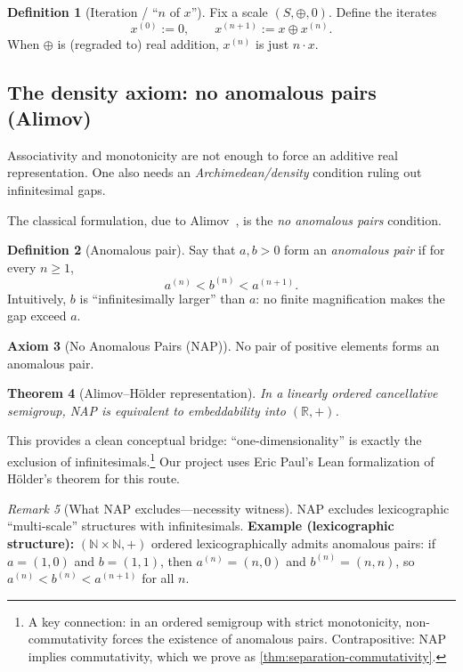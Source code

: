 \documentclass[11pt]{article}
\newtheorem{theorem}{Theorem}[section]
\theoremstyle{definition}
\newtheorem{definition}[theorem]{Definition}
\newtheorem{axiom}[theorem]{Axiom}
\theoremstyle{remark}
\newtheorem{remark}[theorem]{Remark}
\begin{document}
\begin{definition}[Iteration / ``$n$ of $x$'']
Fix a scale $(S,\oplus,0)$.  Define the iterates
\[
x^{(0)} := 0,\qquad x^{(n+1)} := x \oplus x^{(n)}.
\]
When $\oplus$ is (regraded to) real addition, $x^{(n)}$ is just $n\cdot x$.
\end{definition}

\subsection{The density axiom: no anomalous pairs (Alimov)}

Associativity and monotonicity are not enough to force an additive real representation.
One also needs an \emph{Archimedean/density} condition ruling out infinitesimal gaps.

The classical formulation, due to Alimov~\cite{Alimov1950},
is the \emph{no anomalous pairs} condition.

\begin{definition}[Anomalous pair]
Say that $a,b>0$ form an \emph{anomalous pair} if for every $n\ge 1$,
\[
a^{(n)} < b^{(n)} < a^{(n+1)}.
\]
Intuitively, $b$ is ``infinitesimally larger'' than $a$: no finite magnification makes the gap exceed $a$.
\end{definition}

\begin{axiom}[No Anomalous Pairs (NAP)]
No pair of positive elements forms an anomalous pair.
\end{axiom}

\begin{theorem}[Alimov--H\"older representation]
In a linearly ordered cancellative semigroup, NAP is equivalent to embeddability into $(\mathbb{R},+)$.
\end{theorem}

This provides a clean conceptual bridge: ``one-dimensionality'' is exactly the exclusion of
infinitesimals.\footnote{A key connection: in an ordered semigroup with strict monotonicity,
non-commutativity forces the existence of anomalous pairs.  Contrapositive: NAP implies
commutativity, which we prove as \cref{thm:separation-commutativity}.}
Our project uses Eric Paul's Lean formalization of H\"older's theorem for this route.

\begin{remark}[What NAP excludes---necessity witness]
NAP excludes lexicographic ``multi-scale'' structures with infinitesimals.
\textbf{Example (lexicographic structure):} $(\mathbb{N}\times\mathbb{N},+)$ ordered lexicographically admits anomalous pairs:
if $a=(1,0)$ and $b=(1,1)$, then $a^{(n)}=(n,0)$ and $b^{(n)}=(n,n)$, so
$a^{(n)} < b^{(n)} < a^{(n+1)}$ for all $n$.
\end{remark}
\end{document}
